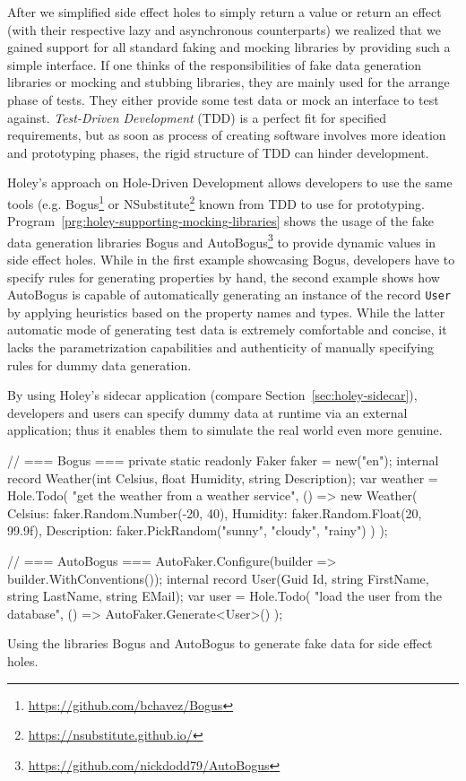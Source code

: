 After we simplified side effect holes to simply return a value or return an effect (with their respective lazy and asynchronous counterparts) we realized that we gained support for all standard faking and mocking libraries by providing such a simple interface.
If one thinks of the responsibilities of fake data generation libraries or mocking and stubbing libraries, they are mainly used for the arrange phase of tests.
They either provide some test data or mock an interface to test against.
\emph{Test-Driven Development} (TDD) is a perfect fit for specified requirements, but as soon as process of creating software involves more ideation and prototyping phases, the rigid structure of TDD can hinder development.

Holey's approach on Hole-Driven Development allows developers to use the same tools (e.g. Bogus\footnote{\url{https://github.com/bchavez/Bogus}} or NSubstitute\footnote{\url{https://nsubstitute.github.io/}} known from TDD to use for prototyping.
Program~\ref{prg:holey-supporting-mocking-libraries} shows the usage of the fake data generation libraries Bogus and AutoBogus\footnote{\url{https://github.com/nickdodd79/AutoBogus}} to provide dynamic values in side effect holes.
While in the first example showcasing Bogus, developers have to specify rules for generating properties by hand, the second example shows how AutoBogus is capable of automatically generating an instance of the record \texttt{User} by applying heuristics based on the property names and types.
While the latter automatic mode of generating test data is extremely comfortable and concise, it lacks the parametrization capabilities and authenticity of manually specifying rules for dummy data generation.

By using Holey's sidecar application (compare Section~\ref{sec:holey-sidecar}), developers and users can specify dummy data at runtime via an external application; thus it enables them to simulate the real world even more genuine.

\begin{program}[ht]
\begin{CsCode}
// === Bogus ===
private static readonly Faker faker = new("en");
internal record Weather(int Celsius, float Humidity, string Description);
var weather = Hole.Todo(
	"get the weather from a weather service",
	() =>
		new Weather(
			Celsius: faker.Random.Number(-20, 40),
			Humidity: faker.Random.Float(20, 99.9f),
			Description: faker.PickRandom("sunny", "cloudy", "rainy")
		)
);

// === AutoBogus ===
AutoFaker.Configure(builder => builder.WithConventions());
internal record User(Guid Id, string FirstName, string LastName, string EMail);
var user = Hole.Todo(
    "load the user from the database",
    () => AutoFaker.Generate<User>()
);
\end{CsCode}
\caption{Using the libraries Bogus and AutoBogus to generate fake data for side effect holes.}
\label{prg:holey-supporting-mocking-libraries}
\end{program}

